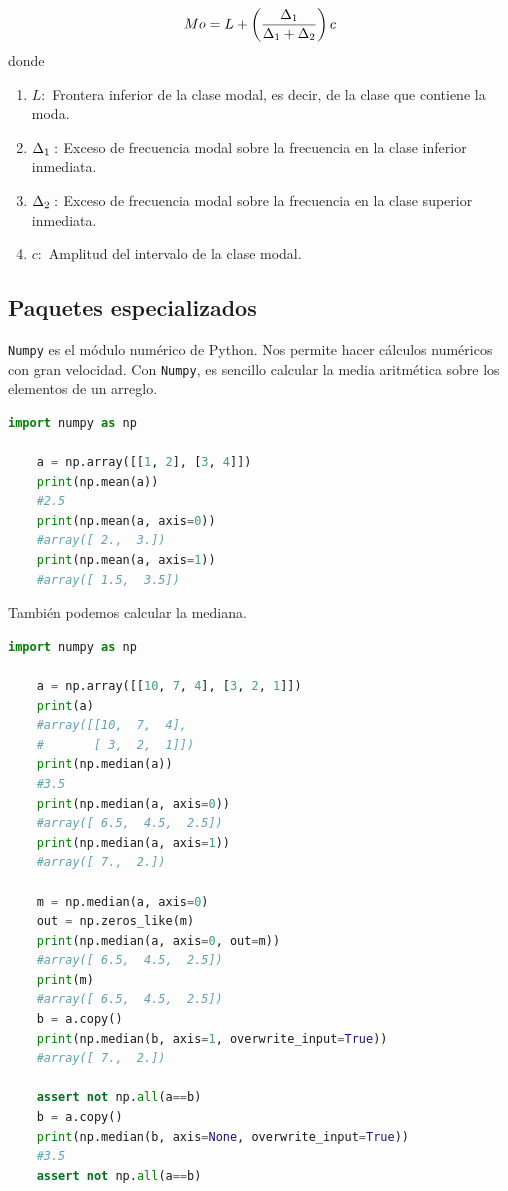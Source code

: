 \begin{definicion}
	\begin{align}
		Mo=
		L + \left( \dfrac{\Delta_{1}}{\Delta_{1}+\Delta_{2}} \right)c
	\end{align}
	donde 
	\begin{enumerate}
		\item $L:$ Frontera inferior de la clase modal, es decir, de la clase que contiene la moda.
		\item $\Delta_{1}:$ Exceso de frecuencia modal sobre la frecuencia en la clase inferior inmediata. 
		\item $\Delta_{2}:$ Exceso de frecuencia modal sobre la frecuencia en la clase superior inmediata. 
		\item $c:$ Amplitud del intervalo de la clase modal.
	\end{enumerate}
	
\end{definicion}



\subsection{Paquetes especializados}

\texttt{Numpy} es el módulo numérico de Python. Nos permite hacer cálculos numéricos con gran velocidad. Con \texttt{Numpy}, es sencillo calcular  la media aritmética sobre los elementos de un arreglo.

\begin{lstlisting}[language=Python]
	import numpy as np
	
	a = np.array([[1, 2], [3, 4]])
	print(np.mean(a))
	#2.5
	print(np.mean(a, axis=0))
	#array([ 2.,  3.])
	print(np.mean(a, axis=1))
	#array([ 1.5,  3.5])
\end{lstlisting}


También podemos calcular la mediana.
\begin{lstlisting}[language=Python]
	import numpy as np
	
	a = np.array([[10, 7, 4], [3, 2, 1]])
	print(a)
	#array([[10,  7,  4],
	#       [ 3,  2,  1]])
	print(np.median(a))
	#3.5
	print(np.median(a, axis=0))
	#array([ 6.5,  4.5,  2.5])
	print(np.median(a, axis=1))
	#array([ 7.,  2.])
	
	m = np.median(a, axis=0)
	out = np.zeros_like(m)
	print(np.median(a, axis=0, out=m))
	#array([ 6.5,  4.5,  2.5])
	print(m)
	#array([ 6.5,  4.5,  2.5])
	b = a.copy()
	print(np.median(b, axis=1, overwrite_input=True))
	#array([ 7.,  2.])
	
	assert not np.all(a==b)
	b = a.copy()
	print(np.median(b, axis=None, overwrite_input=True))
	#3.5
	assert not np.all(a==b)
\end{lstlisting}

